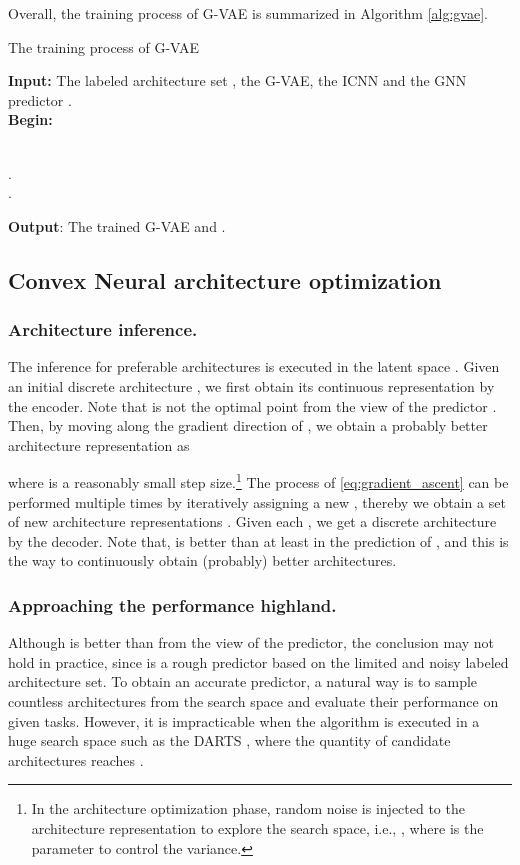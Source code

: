 \documentclass[10pt,twocolumn,letterpaper]{article}
\begin{document}
Overall, the training process of G-VAE is summarized in Algorithm \ref{alg:gvae}.
\begin{algorithm}[htbp]
\caption{The training process of G-VAE}
{\textbf{Input:} The labeled architecture set }, the G-VAE, the ICNN  and the GNN predictor . \\
{\textbf{Begin:}}
\begin{algorithmic}[1]
		 \\
		. \\
		. \\
		 
	\end{algorithmic}
	\textbf{Output}: The trained G-VAE and  . 
	\label{alg:gvae}
\end{algorithm}
\subsection{Convex Neural architecture optimization}
\subsubsection{Architecture inference.} 
The inference for preferable architectures is executed in the latent space . Given an initial discrete architecture , we first obtain its continuous representation  by the encoder. Note that  is not the optimal point from the view of the predictor . Then, by moving  along the gradient direction of , we obtain a probably better architecture representation  as

where  is a reasonably small step size.\footnote{In the architecture optimization phase, random noise is injected to the architecture representation  to explore the search space, i.e., , where  is the parameter to control the variance.} The process of \eqref{eq:gradient_ascent} can be performed multiple times by iteratively assigning a new , thereby we obtain a set of new architecture representations . Given each , we get a discrete architecture by the decoder. Note that,  is better than  at least in the prediction of , and this is the way to continuously obtain (probably) better architectures. 
\subsubsection{Approaching the performance highland.}
Although  is better than  from the view of the predictor, the conclusion may not hold in practice, since  is a rough predictor based on the limited and noisy labeled architecture set. To obtain an accurate predictor, a natural way is to sample countless architectures from the search space and evaluate their performance on given tasks. However, it is impracticable when the algorithm is executed in a huge search space such as the DARTS \cite{liu2018darts}, where the quantity of candidate architectures reaches . 
\end{document}

